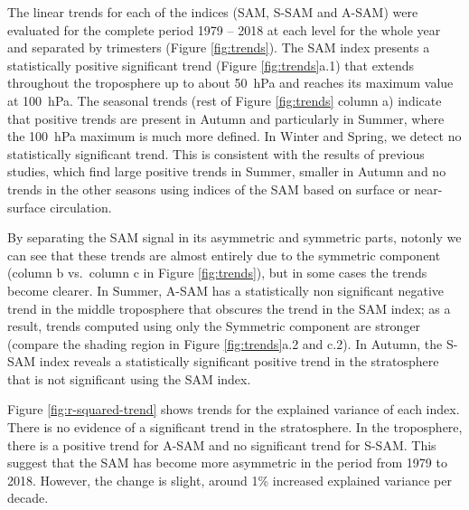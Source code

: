 \documentclass[smallextended]{svjour3}       %
\begin{document}
The linear trends for each of the indices (SAM, S\nobreakdash-SAM and A\nobreakdash-SAM) were evaluated for the complete period 1979 -- 2018 at each level for the whole year and separated by trimesters (Figure \ref{fig:trends}). The SAM index presents a statistically positive significant trend (Figure \ref{fig:trends}a.1) that extends throughout the troposphere up to about 50~hPa and reaches its maximum value at 100~hPa. The seasonal trends (rest of Figure \ref{fig:trends} column a) indicate that positive trends are present in Autumn and particularly in Summer, where the 100~hPa maximum is much more defined. In Winter and Spring, we detect no statistically significant trend. This is consistent with the results of previous studies, which find large positive trends in Summer, smaller in Autumn and no trends in the other seasons \citep[e.g.][ and references therein]{fogt2020} using indices of the SAM based on surface or near-surface circulation.

By separating the SAM signal in its asymmetric and symmetric parts, notonly we can see that these trends are almost entirely due to the symmetric component (column b vs.~column c in Figure \ref{fig:trends}), but in some cases the trends become clearer. In Summer, A\nobreakdash-SAM has a statistically non significant negative trend in the middle troposphere that obscures the trend in the SAM index; as a result, trends computed using only the Symmetric component are stronger (compare the shading region in Figure \ref{fig:trends}a.2 and c.2). In Autumn, the S\nobreakdash-SAM index reveals a statistically significant positive trend in the stratosphere that is not significant using the SAM index.

Figure \ref{fig:r-squared-trend} shows trends for the explained variance of each index. There is no evidence of a significant trend in the stratosphere. In the troposphere, there is a positive trend for A\nobreakdash-SAM and no significant trend for S\nobreakdash-SAM. This suggest that the SAM has become more asymmetric in the period from 1979 to 2018. However, the change is slight, around 1\% increased explained variance per decade.
\end{document}

